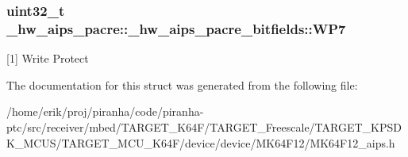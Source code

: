 \subsubsection[{\texorpdfstring{W\+P7}{WP7}}]{\setlength{\rightskip}{0pt plus 5cm}uint32\+\_\+t \+\_\+hw\+\_\+aips\+\_\+pacre\+::\+\_\+hw\+\_\+aips\+\_\+pacre\+\_\+bitfields\+::\+W\+P7}\hypertarget{struct__hw__aips__pacre_1_1__hw__aips__pacre__bitfields_aea62bfbf628ba28d86dc538a625fd5c9}{}\label{struct__hw__aips__pacre_1_1__hw__aips__pacre__bitfields_aea62bfbf628ba28d86dc538a625fd5c9}
\mbox{[}1\mbox{]} Write Protect 

The documentation for this struct was generated from the following file\+:\begin{DoxyCompactItemize}
\item 
/home/erik/proj/piranha/code/piranha-\/ptc/src/receiver/mbed/\+T\+A\+R\+G\+E\+T\+\_\+\+K64\+F/\+T\+A\+R\+G\+E\+T\+\_\+\+Freescale/\+T\+A\+R\+G\+E\+T\+\_\+\+K\+P\+S\+D\+K\+\_\+\+M\+C\+U\+S/\+T\+A\+R\+G\+E\+T\+\_\+\+M\+C\+U\+\_\+\+K64\+F/device/device/\+M\+K64\+F12/M\+K64\+F12\+\_\+aips.\+h\end{DoxyCompactItemize}
